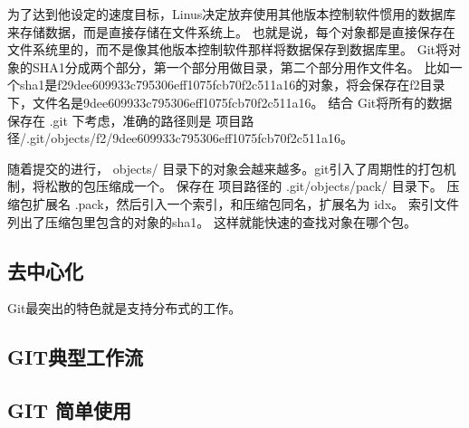 为了达到他设定的速度目标，Linus决定放弃使用其他版本控制软件惯用的数据库来存储数据，而是直接存储在文件系统上。
也就是说，每个对象都是直接保存在文件系统里的，而不是像其他版本控制软件那样将数据保存到数据库里。
Git将对象的SHA1分成两个部分，第一个部分用做目录，第二个部分用作文件名。
比如一个sha1是f29dee609933c795306eff1075fcb70f2c511a16的对象，将会保存在f2目录下，文件名是9dee609933c795306eff1075fcb70f2c511a16。
结合 Git将所有的数据保存在 .git 下考虑，准确的路径则是 项目路径/.git/objects/f2/9dee609933c795306eff1075fcb70f2c511a16。

随着提交的进行， objects/ 目录下的对象会越来越多。git引入了周期性的打包机制，将松散的包压缩成一个。
保存在 项目路径的 .git/objects/pack/ 目录下。
压缩包扩展名 .pack，然后引入一个索引，和压缩包同名，扩展名为 idx。
索引文件列出了压缩包里包含的对象的sha1。
这样就能快速的查找对象在哪个包。

\subsection{去中心化}

Git最突出的特色就是支持分布式的工作。

\subsection{GIT典型工作流}
\subsection{GIT 简单使用}



